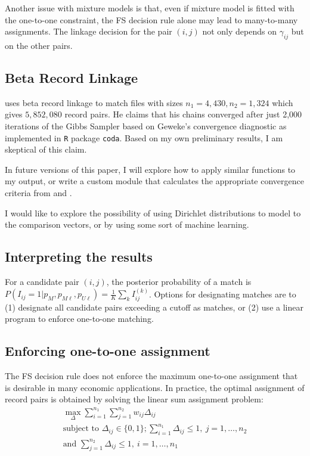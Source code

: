 \documentclass[11pt,reqno]{amsart}
\begin{document}
Another issue with mixture models is that, even if mixture model is fitted with the one-to-one constraint, the FS decision rule alone may lead to many-to-many assignments.  The linkage decision for the pair $(i,j)$ not only depends on $\gamma_{ij}$ but on the other pairs. 

\subsection{Beta Record Linkage}
\cite{sadinle_2017} uses beta record linkage to match files with sizes $n_1 = 4,430, n_2 = 1,324$ which gives $5,852,080$ record pairs.  He claims that his chains converged after just 2,000 iterations of the Gibbs Sampler based on Geweke's convergence diagnostic as implemented in \texttt{R} package \texttt{coda}.  Based on my own preliminary results, I am skeptical of this claim. 

In future versions of this paper, I will explore how to apply similar functions to my output, or write a custom module that calculates the appropriate convergence criteria from \cite{brooks_gelman_1998} and  \cite{gelman_rubin_1992}.



I would like to explore the possibility of using Dirichlet distributions to model to the comparison vectors, or by using some sort of machine learning. 

\subsection{Interpreting the results}  For a candidate pair $(i,j)$, the posterior probability of a match is $P(I_{ij}  = 1 | p_M, p_{M\ell}, p_{U\ell}) = \frac{1}{K}\sum_k I_{ij}^{(k)}$.  Options for designating matches are to (1) designate all candidate pairs exceeding a cutoff as matches, or (2) use a linear program to enforce one-to-one matching. 

\subsection{Enforcing one-to-one assignment}

The FS decision rule does not enforce the maximum one-to-one assignment that is desirable in many economic applications.  In practice, the optimal assignment of record pairs is obtained by solving the linear sum assignment problem: 
\begin{gather*}
\max_{\Delta} \sum_{i=1}^{n_1}\sum_{j=1}^{n_2} w_{ij} \Delta_{ij}\\
\text{subject to } \Delta_{ij} \in \{0,1\}; \sum_{i=1}^{n_1} \Delta_{ij} \leq 1, \ j=1, \dots, n_2 \\ \text{and } \sum_{j=1}^{n_2} \Delta_{ij} \leq 1, \ i=1, \dots, n_1 
\end{gather*} 
\end{document}
